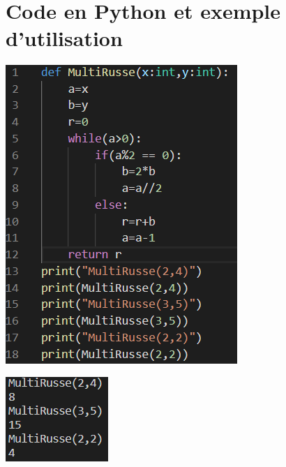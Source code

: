 \documentclass[12pt,a4paper]{report}
\begin{document}
\section{Code en Python et exemple d'utilisation}
\begin{center}
\begin{minipage}{0.48\linewidth}
\includegraphics[width=\linewidth]{MultRussePython}
\end{minipage}%
\hfill
\begin{minipage}{0.49\linewidth}
\includegraphics[width=\linewidth]{ExemplesPython}
\end{minipage}
\end{center}
\end{document}
